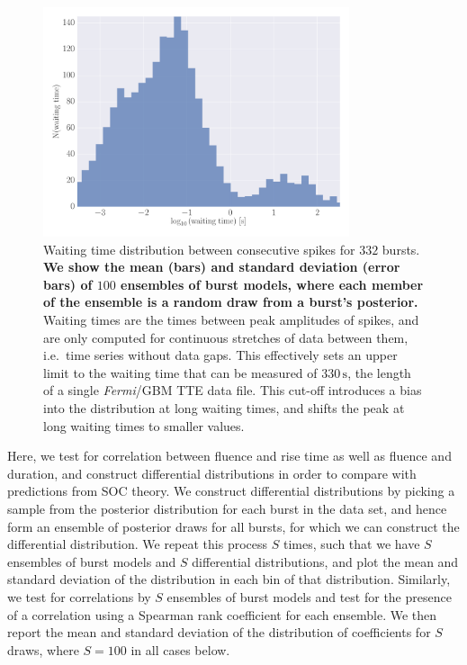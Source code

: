 \documentclass[12pt]{emulateapj}
\newcommand{\project}[1]{\textsl{#1}}
\newcommand{\fermi}{\project{Fermi}}
\begin{document}
  \begin{figure}[htbp]
\begin{center}
\includegraphics[width=9cm]{f8.pdf}%
\caption{Waiting time distribution between consecutive spikes for $332$ bursts.  {\bf We show the mean (bars) and standard deviation (error bars) of $100$ ensembles of burst models, where each member of the ensemble is a random draw from a burst's posterior.} Waiting times are the times between peak amplitudes of spikes, and are only computed for
continuous stretches of data between them, i.e.\ time series without data gaps. This effectively sets an upper limit to the waiting time that can be measured of $330\,\mathrm{s}$, the 
length of a single \fermi/GBM TTE data file. This cut-off introduces a bias into the distribution at long waiting times, and shifts the peak at long waiting times to smaller values.}
\label{fig:waitingtimes}
\end{center}
\end{figure}


 Here, we test for correlation between fluence and rise time as well as fluence and duration, and construct differential distributions
 in order to compare with predictions from SOC theory. We construct differential distributions by picking a sample from the posterior distribution
 for each burst in the data set, and hence form an ensemble of posterior draws for all bursts, for which we can construct the differential distribution.
 We repeat this process $S$ times, such that we have $S$ ensembles of burst models and $S$ differential distributions, and plot the mean and standard deviation of the distribution in each bin of that distribution. 
 Similarly, we test for correlations by $S$ ensembles of burst models and test for the presence of a correlation using a Spearman rank
 coefficient for each ensemble. We then report the mean and standard deviation of the distribution of coefficients for $S$ draws, where $S = 100$ in all cases below.
\end{document}
